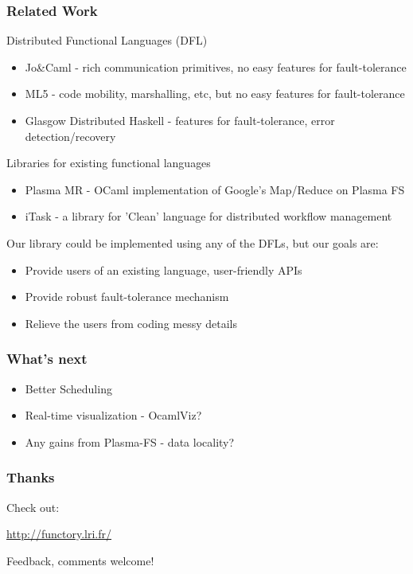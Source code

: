 \documentclass[xcolor=dvipsnames]{beamer}
\begin{document}
\begin{frame}\frametitle {Related Work}
  Distributed Functional Languages (DFL)
  \begin{itemize}
  \item Jo\&Caml - rich communication primitives, no easy features
    for fault-tolerance
  \item ML5 - code mobility, marshalling, etc, but no
    easy features for fault-tolerance
  \item Glasgow Distributed Haskell - features for fault-tolerance,
    error detection/recovery
  \end{itemize}
  Libraries for existing functional languages
  \begin{itemize}
  \item Plasma MR - OCaml implementation of Google's Map/Reduce on
    Plasma FS
  \item iTask - a library for 'Clean' language for distributed workflow management
  \end{itemize}

Our library could be implemented using any of the DFLs, but our goals
are:
\begin{itemize}
\item Provide users of an existing language, user-friendly APIs
\item Provide robust fault-tolerance mechanism 
\item Relieve the users from coding messy details
\end{itemize}
  
\end{frame}


\begin{frame}\frametitle {What's next}
  \begin{itemize}
  \item Better Scheduling
  \item Real-time visualization - OcamlViz?
  \item Any gains from Plasma-FS - data locality?
  \end{itemize}
\end{frame}


\begin{frame}\frametitle {Thanks}


\bigskip
Check out:
\begin{center}
 \textcolor{blue}{\url{http://functory.lri.fr/}}  
\end{center}

Feedback, comments welcome!

\end{frame}

\end{document}
